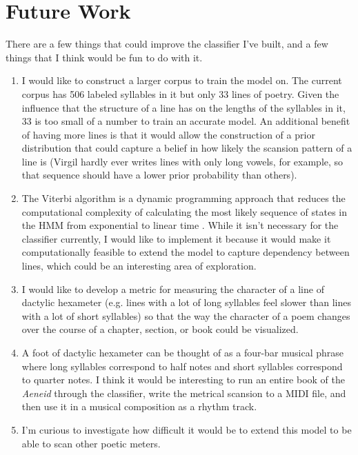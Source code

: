 \documentclass[12pt]{article}
\begin{document}
\section*{Future Work}
There are a few things that could improve the classifier I've built, and a few things that I think would be fun to do with it. 
\begin{enumerate}
\item I would like to construct a larger corpus to train the model on. The current corpus has 506 labeled syllables in it but only 33 lines of poetry. Given the influence that the structure of a line has on the lengths of the syllables in it, 33 is too small of a number to train an accurate model. An additional benefit of having more lines is that it would allow the construction of a prior distribution that could capture a belief in how likely the scansion pattern of a line is (Virgil hardly ever writes lines with only long vowels, for example, so that sequence should have a lower prior probability than others). 
\item The Viterbi algorithm is a dynamic programming approach that reduces the computational complexity of calculating the most likely sequence of states in the HMM from exponential to linear time \cite{Bishop2006a}. While it isn't necessary for the classifier currently, I would like to implement it because it would make it computationally feasible to extend the model to capture dependency between lines, which could be an interesting area of exploration. 
\item I would like to develop a metric for measuring the character of a line of dactylic hexameter (e.g. lines with a lot of long syllables feel slower than lines with a lot of short syllables) so that the way the character of a poem changes over the course of a chapter, section, or book could be visualized. 
\item A foot of dactylic hexameter can be thought of as a four-bar musical phrase where long syllables correspond to half notes and short syllables correspond to quarter notes. I think it would be interesting to run an entire book of the \emph{Aeneid} through the classifier, write the metrical scansion to a MIDI file, and then use it in a musical composition as a rhythm track. 
\item I'm curious to investigate how difficult it would be to extend this model to be able to scan other poetic meters. 
\end{enumerate}




\end{document}
